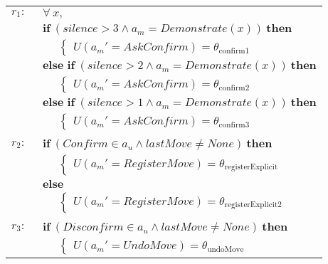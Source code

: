 \begin{footnotesize}
\begin{longtable}{p{1cm}l} 
$r_{1}: \ \ $ &  $\forall \ x, $ \\ & $\textbf{if} \ (\mathit{silence}\!>\!\mathit{3} \land \mathit{a_m}\!=\!\mathit{Demonstrate}(x)) \ \textbf{then}$ \\
& $\;\;\;\;\; \begin{cases}U(\mathit{a_m}'\!=\!\mathit{AskConfirm})\!=\!\theta_{\mathrm{confirm1}}\end{cases}$ \\ 
& $\textbf{else if} \ (\mathit{silence}\!>\!\mathit{2} \land \mathit{a_m}\!=\!\mathit{Demonstrate}(x)) \ \textbf{then}$ \\
& $\;\;\;\;\; \begin{cases}U(\mathit{a_m}'\!=\!\mathit{AskConfirm})\!=\!\theta_{\mathrm{confirm2}}\end{cases}$ \\ 
& $\textbf{else if} \ (\mathit{silence}\!>\!\mathit{1} \land \mathit{a_m}\!=\!\mathit{Demonstrate}(x)) \ \textbf{then}$ \\
& $\;\;\;\;\; \begin{cases}U(\mathit{a_m}'\!=\!\mathit{AskConfirm})\!=\!\theta_{\mathrm{confirm3}}\end{cases}$ \\ \\[-1mm]
$r_{2}: \ \ $ & $\textbf{if} \ (\mathit{Confirm}\!\in\!\mathit{a_u} \land \mathit{lastMove}\!\neq\!\mathit{None}) \ \textbf{then}$ \\
& $\;\;\;\;\; \begin{cases}U(\mathit{a_m}'\!=\!\mathit{RegisterMove})\!=\!\theta_{\mathrm{registerExplicit}}\end{cases}$\\ 
& $\textbf{else}$ \\
& $\;\;\;\;\; \begin{cases}U(\mathit{a_m}'\!=\!\mathit{RegisterMove})\!=\!\theta_{\mathrm{registerExplicit2}}\end{cases}$ \\ \\[-1mm] 
$r_{3}: \ \ $& $\textbf{if} \ (\mathit{Disconfirm}\!\in\!\mathit{a_u} \land \mathit{lastMove}\!\neq\!\mathit{None}) \ \textbf{then}$ \\
& $\;\;\;\;\; \begin{cases}U(\mathit{a_m}'\!=\!\mathit{UndoMove})\!=\!\theta_{\mathrm{undoMove}}\end{cases}$ \\ 

\end{longtable}
\end{footnotesize}
